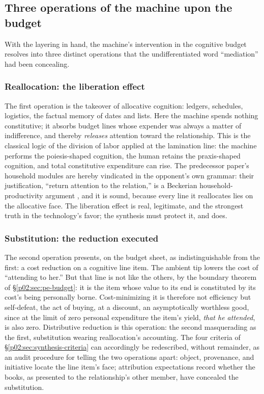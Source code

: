 \subsection{Three operations of the machine upon the budget}
\label{p02:sec:pe-operations}

With the layering in hand, the machine's intervention in the cognitive budget resolves into three distinct operations that the undifferentiated word ``mediation'' had been concealing.

\subsubsection{Reallocation: the liberation effect}
\label{p02:sec:pe-reallocation}

The first operation is the takeover of allocative cognition: ledgers, schedules, logistics, the factual memory of dates and lists. Here the machine spends nothing constitutive; it absorbs budget lines whose expender was always a matter of indifference, and thereby \emph{releases} attention toward the relationship. This is the classical logic of the division of labor applied at the lamination line: the machine performs the poiesis-shaped cognition, the human retains the praxis-shaped cognition, and total constitutive expenditure can rise. The predecessor paper's household modules are hereby vindicated in the opponent's own grammar: their justification, ``return attention to the relation,'' is a Beckerian household-productivity argument \parencite{becker1965theory,becker1981treatise}, and it is sound, because every line it reallocates lies on the allocative face. The liberation effect is real, legitimate, and the strongest truth in the technology's favor; the synthesis must protect it, and does.

\subsubsection{Substitution: the reduction executed}
\label{p02:sec:pe-substitution}

The second operation presents, on the budget sheet, as indistinguishable from the first: a cost reduction on a cognitive line item. The ambient tip lowers the cost of ``attending to her.'' But that line is not like the others, by the boundary theorem of \S\ref{p02:sec:pe-budget}: it is the item whose value to its end is constituted by its cost's being personally borne. Cost-minimizing it is therefore not efficiency but self-defeat, the act of buying, at a discount, an asymptotically worthless good, since at the limit of zero personal expenditure the item's yield, \emph{that he attended}, is also zero. Distributive reduction is this operation: the second masquerading as the first, substitution wearing reallocation's accounting. The four criteria of \S\ref{p02:sec:synthesis-criteria} can accordingly be redescribed, without remainder, as an audit procedure for telling the two operations apart: object, provenance, and initiative locate the line item's face; attribution expectations record whether the books, as presented to the relationship's other member, have concealed the substitution.


